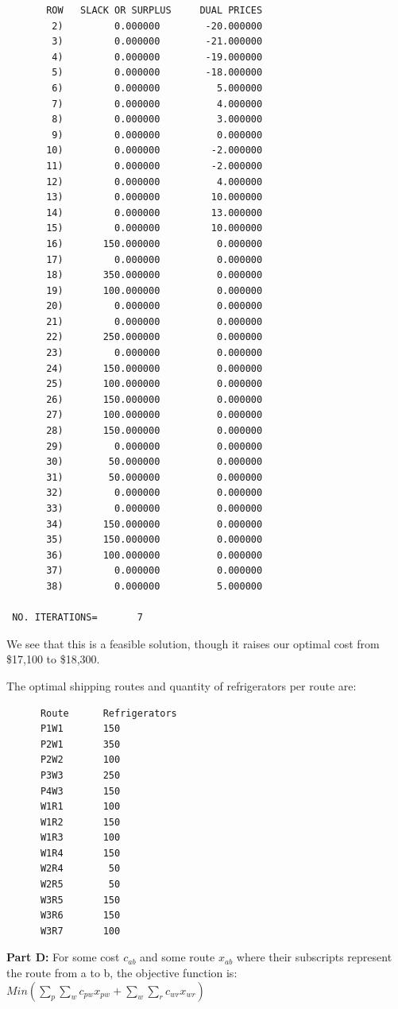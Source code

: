 \documentclass[paper=a4, fontsize=11pt]{scrartcl} %
\numberwithin{equation}{section} %
\numberwithin{figure}{section} %
\numberwithin{table}{section} %
\begin{document}
\begin{verbatim}
       ROW   SLACK OR SURPLUS     DUAL PRICES
        2)         0.000000        -20.000000
        3)         0.000000        -21.000000
        4)         0.000000        -19.000000
        5)         0.000000        -18.000000
        6)         0.000000          5.000000
        7)         0.000000          4.000000
        8)         0.000000          3.000000
        9)         0.000000          0.000000
       10)         0.000000         -2.000000
       11)         0.000000         -2.000000
       12)         0.000000          4.000000
       13)         0.000000         10.000000
       14)         0.000000         13.000000
       15)         0.000000         10.000000
       16)       150.000000          0.000000
       17)         0.000000          0.000000
       18)       350.000000          0.000000
       19)       100.000000          0.000000
       20)         0.000000          0.000000
       21)         0.000000          0.000000
       22)       250.000000          0.000000
       23)         0.000000          0.000000
       24)       150.000000          0.000000
       25)       100.000000          0.000000
       26)       150.000000          0.000000
       27)       100.000000          0.000000
       28)       150.000000          0.000000
       29)         0.000000          0.000000
       30)        50.000000          0.000000
       31)        50.000000          0.000000
       32)         0.000000          0.000000
       33)         0.000000          0.000000
       34)       150.000000          0.000000
       35)       150.000000          0.000000
       36)       100.000000          0.000000
       37)         0.000000          0.000000
       38)         0.000000          5.000000

 NO. ITERATIONS=       7
\end{verbatim}

We see that this is a feasible solution, though it raises our optimal cost from \$17,100 to \$18,300.

The optimal shipping routes and quantity of refrigerators per route are:
    \begin{verbatim}
	  Route      Refrigerators
      P1W1       150
      P2W1       350
      P2W2       100
      P3W3       250
      P4W3       150
      W1R1       100
      W1R2       150
      W1R3       100
      W1R4       150
      W2R4        50
      W2R5        50
      W3R5       150
      W3R6       150
      W3R7       100
    \end{verbatim}
\textbf{Part D:}\newline
For some cost $c_{ab}$ and some route $x_{ab}$ where their subscripts represent the route from a to b, the objective function is:\newline
$Min (\sum_{p}{ \sum_{w}{c_{pw} x_{pw}}} + \sum_{w}{ \sum_{r}{c_{wr} x_{wr}}})$\newline
\end{document}
